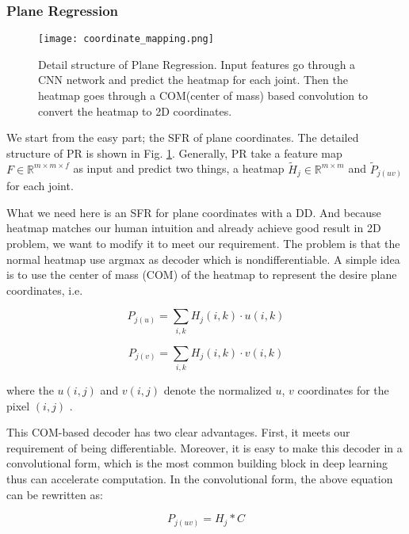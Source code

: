 \documentclass[journal]{IEEEtran}
\begin{document}
\subsubsection{Plane Regression}

\begin{figure}[!t]
  \centering
  \texttt{[image: coordinate\_mapping.png]}
  \caption{Detail structure of Plane Regression. 
  Input features go through a CNN network and predict the heatmap for each joint. 
  Then the heatmap goes through a COM(center of mass) based convolution to convert the heatmap to 2D coordinates.
  }
  \label{PR}
\end{figure}

We start from the easy part; the SFR of plane coordinates. 
The detailed structure of PR is shown in Fig\@. \ref{PR}. 
Generally, PR take a feature map $F \in \mathbb{R}^{m \times m \times f}$ as input and predict two things, 
a heatmap $\tilde{H}_{j} \in \mathbb{R}^{m \times m}$ and $\tilde{P}_{j(u v)}$ for each joint. 

What we need here is an SFR for plane coordinates with a DD. 
And because heatmap matches our human intuition and already achieve good result in 2D problem, 
we want to modify it to meet our requirement. 
The problem is that the normal heatmap use argmax as decoder which is nondifferentiable. 
A simple idea is to use the center of mass (COM) of the heatmap to represent the desire plane coordinates, i.e. 

\begin{equation}
  P_{j(u)}=\sum_{i, k} H_{j}(i, k) \cdot u(i, k)
\end{equation}

\begin{equation}
  P_{j(v)}=\sum_{i, k} H_{j}(i, k) \cdot v(i, k)
\end{equation}

where the $u(i,j)$ and $v(i,j)$ denote the normalized $u$, $v$ coordinates for the pixel $(i,j)$ .

This COM-based decoder has two clear advantages. 
First, it meets our requirement of being differentiable. 
Moreover, it is easy to make this decoder in a convolutional form, which is the most common building block in deep learning thus can accelerate computation. 
In the convolutional form, the above equation can be rewritten as: 

\begin{equation}
  P_{j(u v)}=H_{j} * C
\end{equation}
\end{document}
